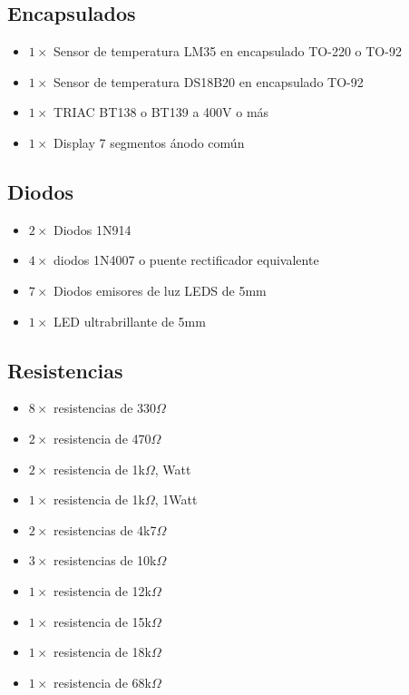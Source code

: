 \documentclass[letterpaper,10.5pt]{article}
\begin{document}
\subsection{Encapsulados}
\begin{itemize}[nosep]
	\item $1\times$ Sensor de temperatura LM35 en encapsulado TO-220 o TO-92
	\item $1\times$ Sensor de temperatura DS18B20 en encapsulado TO-92
	\item $1\times$ TRIAC BT138 o BT139 a 400V o más
	\item $1\times$ Display 7 segmentos ánodo común
\end{itemize}

\subsection{Diodos}
\begin{itemize}[nosep]
	\item $2\times$ Diodos 1N914
	\item $4\times$ diodos 1N4007 o puente rectificador equivalente
	\item $7\times$ Diodos emisores de luz LEDS de 5mm
	\item $1\times$ LED ultrabrillante de 5mm
\end{itemize}

\subsection{Resistencias}
\begin{itemize}[nosep]
	\item $8\times$ resistencias de 330$\Omega$
	\item $2\times$ resistencia  de 470$\Omega$
	\item $2\times$ resistencia  de  1k$\Omega$, Watt
	\item $1\times$ resistencia  de  1k$\Omega$, 1Watt
	\item $2\times$ resistencias de 4k7$\Omega$
	\item $3\times$ resistencias de 10k$\Omega$
	\item $1\times$ resistencia  de 12k$\Omega$
	\item $1\times$ resistencia  de 15k$\Omega$
	\item $1\times$ resistencia  de 18k$\Omega$
	\item $1\times$ resistencia  de 68k$\Omega$
\end{itemize}
\end{document}
